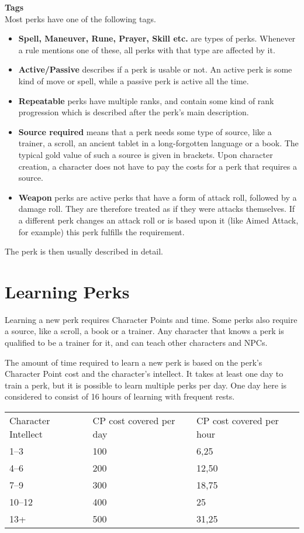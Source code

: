 \textbf{Tags}\\
Most perks have one of the following tags.\\
\begin{itemize}
	\item \textbf{Spell, Maneuver, Rune, Prayer, Skill etc.} are types of perks.
	 Whenever a rule mentions one of these, all perks with that type are affected by it.\\
	\item \textbf{Active/Passive} describes if a perk is usable or not.
	An active perk is some kind of move or spell, while a passive perk is active all the time.\\
	\item \textbf{Repeatable} perks have multiple ranks, and contain some kind of rank progression which is described after the perk's main description.\\
	\item \textbf{Source required} means that a perk needs some type of source, like a trainer, a scroll, an ancient tablet in a long-forgotten language or a book.
	The typical gold value of such a source is given in brackets.
	Upon character creation, a character does not have to pay the costs for a perk that requires a source.\\
	\item \textbf{Weapon} perks are active perks that have a form of attack roll, followed by a damage roll.
	They are therefore treated as if they were attacks themselves.
	If a different perk changes an attack roll or is based upon it (like Aimed Attack, for example) this perk fulfills the requirement.\\
\end{itemize}

The perk is then usually described in detail.

\section{Learning Perks}
Learning a new perk requires Character Points and time.
Some perks also require a source, like a scroll, a book or a trainer.
Any character that knows a perk is qualified to be a trainer for it, and can teach other characters and NPCs.

The amount of time required to learn a new perk is based on the perk's Character Point cost and the character's intellect.
It takes at least one day to train a perk, but it is possible to learn multiple perks per day.
One day here is considered to consist of 16 hours of learning with frequent rests.\\

\begin{tabular}{l | l | l}
	Character Intellect & CP cost covered per day & CP cost covered per hour\\
	1--3 & 100 & 6,25\\
	4--6 & 200 & 12,50\\
	7--9 & 300 & 18,75\\
	10--12 & 400 & 25\\
	13+ & 500 & 31,25
\end{tabular}